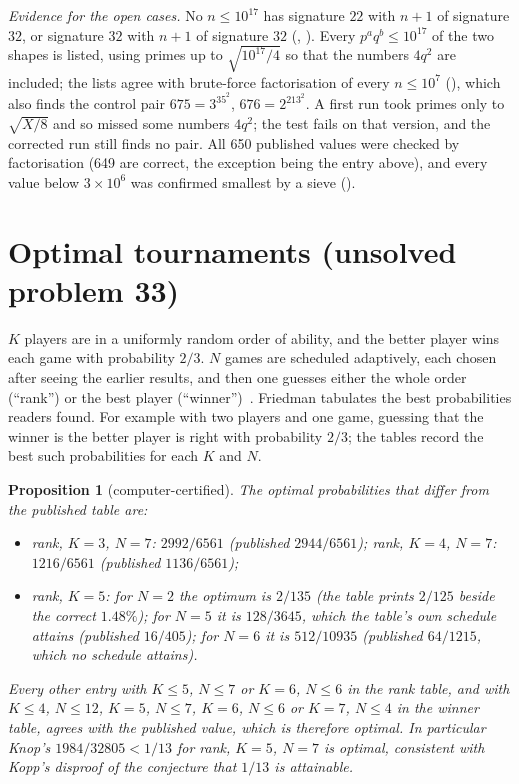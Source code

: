 \documentclass[11pt]{amsart}
\newtheorem{proposition}[theorem]{Proposition}
\theoremstyle{remark}
\begin{document}
\noindent\emph{Evidence for the open cases.} No $n\le10^{17}$ has signature $22$ with $n+1$ of
signature $32$, or signature $32$ with $n+1$ of signature $32$ (,
). Every $p^aq^b\le10^{17}$ of the two shapes is listed, using primes up
to $\sqrt{10^{17}/4}$ so that the numbers $4q^2$ are included; the lists agree with brute-force
factorisation of every $n\le10^7$ (), which also finds the control pair
$675=3^35^2$, $676=2^213^2$. A first run took primes only to $\sqrt{X/8}$ and so missed some numbers $4q^2$;
the test fails on that version, and the corrected run still finds no pair. All 650 published values were
checked by factorisation (649 are correct, the exception being the entry above), and every value below
$3\times10^6$ was confirmed smallest by a sieve ().

\section{Optimal tournaments (unsolved problem 33)}\label{sec:tournament}

$K$ players are in a uniformly random order of ability, and the better player wins each game with
probability $2/3$. $N$ games are scheduled adaptively, each chosen after seeing the earlier results, and
then one guesses either the whole order (``rank'') or the best player (``winner'')~\cite{tournament}.
Friedman tabulates the best probabilities readers found. For example with two players and one game,
guessing that the winner is the better player is right with probability $2/3$; the tables record the
best such probabilities for each $K$ and $N$.

\begin{proposition}[computer-certified]
The optimal probabilities that differ from the published table are:
\begin{itemize}
\item rank, $K=3$, $N=7$: $2992/6561$ (published $2944/6561$); rank, $K=4$, $N=7$: $1216/6561$
(published $1136/6561$);
\item rank, $K=5$: for $N=2$ the optimum is $2/135$ (the table prints $2/125$ beside the correct
$1.48\%$); for $N=5$ it is $128/3645$, which the table's own schedule attains (published $16/405$);
for $N=6$ it is $512/10935$ (published $64/1215$, which no schedule attains).
\end{itemize}
Every other entry with $K\le5$, $N\le7$ or $K=6$, $N\le6$ in the rank table, and with $K\le4$, $N\le12$,
$K=5$, $N\le7$, $K=6$, $N\le6$ or $K=7$, $N\le4$ in the winner table, agrees with the published value,
which is therefore optimal. In particular Knop's $1984/32805<1/13$ for rank, $K=5$, $N=7$ is optimal,
consistent with Kopp's disproof of the conjecture that $1/13$ is attainable.
\end{proposition}
\end{document}
